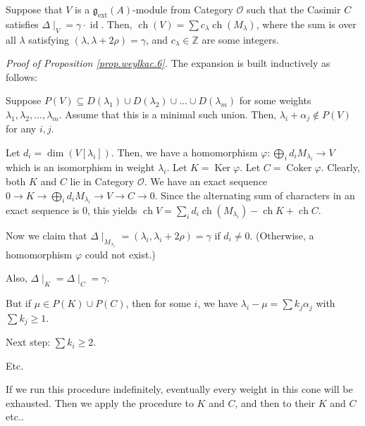 \documentclass[etingof-lie.tex]{subfiles}
\begin{document}
\begin{proposition}
\label{prop.weylkac.6}Suppose that $V$ is a $\mathfrak{g}_{\operatorname*{ext}%
}\left(  A\right)  $-module from Category $\mathcal{O}$ such that the Casimir
$C$ satisfies $\Delta\mid_{V}=\gamma\cdot\operatorname*{id}$. Then,
$\operatorname*{ch}\left(  V\right)  =\sum c_{\lambda}\operatorname*{ch}%
\left(  M_{\lambda}\right)  $, where the sum is over all $\lambda$ satisfying
$\left(  \lambda,\lambda+2\rho\right)  =\gamma$, and $c_{\lambda}\in
\mathbb{Z}$ are some integers.
\end{proposition}

\textit{Proof of Proposition \ref{prop.weylkac.6}.} The expansion is built
inductively as follows:

Suppose $P\left(  V\right)  \subseteq D\left(  \lambda_{1}\right)  \cup
D\left(  \lambda_{2}\right)  \cup...\cup D\left(  \lambda_{m}\right)  $ for
some weights $\lambda_{1},\lambda_{2},...,\lambda_{m}$. Assume that this is a
minimal such union. Then, $\lambda_{i}+\alpha_{j}\notin P\left(  V\right)  $
for any $i,j$.

Let $d_{i}=\dim\left(  V\left[  \lambda_{i}\right]  \right)  $. Then, we have
a homomorphism $\varphi:\bigoplus_{i}d_{i}M_{\lambda_{i}}\rightarrow V$ which
is an isomorphism in weight $\lambda_{i}$. Let $K=\operatorname*{Ker}\varphi$.
Let $C=\operatorname*{Coker}\varphi$. Clearly, both $K$ and $C$ lie in
Category $\mathcal{O}$. We have an exact sequence $0\rightarrow K\rightarrow
\bigoplus_{i}d_{i}M_{\lambda_{i}}\rightarrow V\rightarrow C\rightarrow0$.
Since the alternating sum of characters in an exact sequence is $0$, this
yields $\operatorname*{ch}V=\sum_{i}d_{i}\operatorname*{ch}\left(
M_{\lambda_{i}}\right)  -\operatorname*{ch}K+\operatorname*{ch}C$.

Now we claim that $\Delta\mid_{M_{\lambda_{i}}}=\left(  \lambda_{i}%
,\lambda_{i}+2\rho\right)  =\gamma$ if $d_{i}\neq0$. (Otherwise, a
homomorphism $\varphi$ could not exist.)

Also, $\Delta\mid_{K}=\Delta\mid_{C}=\gamma$.

But if $\mu\in P\left(  K\right)  \cup P\left(  C\right)  $, then for some
$i$, we have $\lambda_{i}-\mu=\sum k_{j}\alpha_{j}$ with $\sum k_{j}\geq1$.

Next step: $\sum k_{i}\geq2$.

Etc.

If we run this procedure indefinitely, eventually every weight in this cone
will be exhausted. Then we apply the procedure to $K$ and $C$, and then to
their $K$ and $C$ etc..
\end{document}
